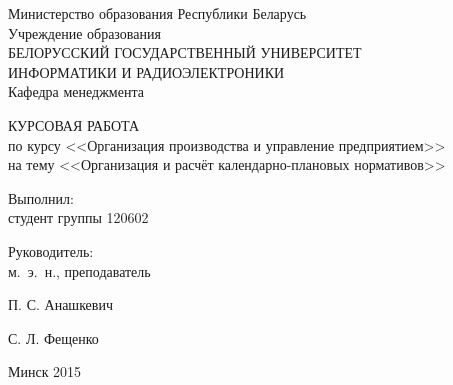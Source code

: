 \begin{titlepage}
\thispagestyle{empty}
\setlength{\parindent}{0mm} %

\begin{center}
  Министерство образования Республики Беларусь \\
  \bigskip
  Учреждение образования \\
  БЕЛОРУССКИЙ ГОСУДАРСТВЕННЫЙ УНИВЕРСИТЕТ \\
  ИНФОРМАТИКИ И РАДИОЭЛЕКТРОНИКИ \\
  \bigskip
  \bigskip
  Кафедра менеджмента
\end{center}

\vspace{50mm}

\begin{center}
  {\LARGE КУРСОВАЯ РАБОТА} \\
  по курсу <<Организация производства и управление предприятием>> \\
  на тему <<Организация и расчёт календарно-плановых нормативов>>
\end{center}

\vspace{30mm}

\begin{minipage}{.65\linewidth}
    Выполнил: \\
    студент группы 120602

    \bigskip

    Руководитель: \\
    м.~э.~н., преподаватель
\end{minipage}
\hfill
\begin{minipage}{.25\linewidth}
  \vspace{8mm}
  П. С. Анашкевич

  \vspace{10mm}
  С. Л. Фещенко
\end{minipage}

\vspace{45mm}
\begin{center}
  Минск 2015
\end{center}

\setlength{\parindent}{5ex} %
\end{titlepage}
